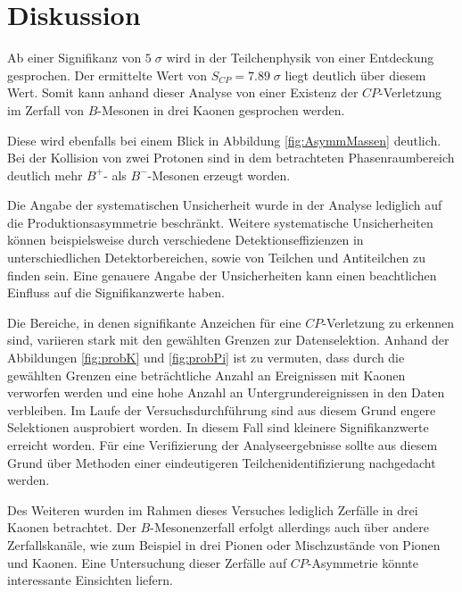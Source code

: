 \section{Diskussion}
Ab einer Signifikanz von $5\;\sigma$ wird in der Teilchenphysik von einer Entdeckung gesprochen. Der ermittelte Wert von $ S_{CP} = 7.89\;\sigma$ liegt deutlich über diesem Wert. Somit kann anhand dieser Analyse von einer Existenz der $CP$-Verletzung im Zerfall von $B$-Mesonen in drei Kaonen gesprochen werden.

Diese wird ebenfalls bei einem Blick in Abbildung \ref{fig:AsymmMassen} deutlich. Bei der Kollision von zwei Protonen sind in dem betrachteten Phasenraumbereich deutlich mehr $B^{+}$- als $B^{-}$-Mesonen erzeugt worden.

Die Angabe der systematischen Unsicherheit wurde in der Analyse lediglich auf die Produktionsasymmetrie beschränkt. Weitere systematische Unsicherheiten können beispielsweise durch verschiedene Detektionseffizienzen in unterschiedlichen Detektorbereichen, sowie von Teilchen und Antiteilchen zu finden sein. Eine genauere Angabe der Unsicherheiten kann einen beachtlichen Einfluss auf die Signifikanzwerte haben.

Die Bereiche, in denen signifikante Anzeichen für eine $CP$-Verletzung zu
erkennen sind, variieren stark mit den gewählten Grenzen zur Datenselektion.
Anhand der Abbildungen \ref{fig:probK} und \ref{fig:probPi} ist zu vermuten,
dass durch die gewählten Grenzen eine beträchtliche Anzahl an Ereignissen mit
Kaonen verworfen werden und eine hohe Anzahl an Untergrundereignissen in den
Daten verbleiben. Im Laufe der Versuchsdurchführung sind aus diesem Grund
engere Selektionen ausprobiert worden. In diesem Fall sind kleinere
Signifikanzwerte erreicht worden.
Für eine Verifizierung der Analyseergebnisse sollte aus diesem Grund über
Methoden einer eindeutigeren Teilchenidentifizierung nachgedacht werden.

Des Weiteren wurden im Rahmen dieses Versuches lediglich Zerfälle in drei
Kaonen betrachtet. Der $B$-Mesonenzerfall erfolgt allerdings auch über andere
Zerfallskanäle, wie zum Beispiel in drei Pionen oder Mischzustände von Pionen
und Kaonen. Eine Untersuchung dieser Zerfälle auf $CP$-Asymmetrie könnte
interessante Einsichten liefern.

